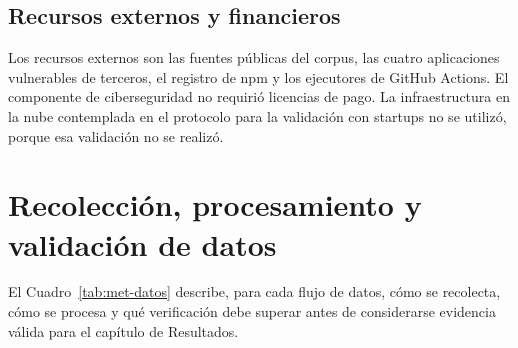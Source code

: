 \subsection{Recursos externos y financieros}
Los recursos externos son las fuentes públicas del corpus, las cuatro aplicaciones vulnerables
de terceros, el registro de npm y los ejecutores de GitHub Actions. El componente de
ciberseguridad no requirió licencias de pago. La infraestructura en la nube contemplada en el
protocolo para la validación con startups no se utilizó, porque esa validación no se realizó.

\section{Recolección, procesamiento y validación de datos}
\label{sec:met-datos}

El Cuadro~\ref{tab:met-datos} describe, para cada flujo de datos, cómo se recolecta, cómo se
procesa y qué verificación debe superar antes de considerarse evidencia válida para el capítulo
de Resultados.

